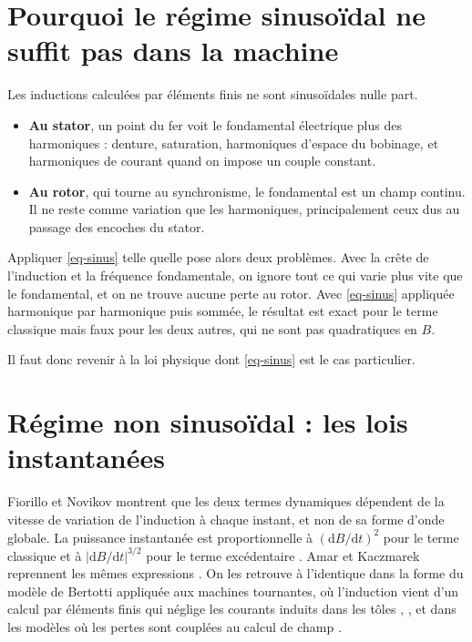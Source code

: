 \documentclass[11pt,a4paper]{article}
\newcommand{\dd}{\mathrm{d}}
\begin{document}
\section{Pourquoi le régime sinusoïdal ne suffit pas dans la machine}

Les inductions calculées par éléments finis ne sont sinusoïdales nulle part.
\begin{itemize}
    \item \textbf{Au stator}, un point du fer voit le fondamental électrique plus des harmoniques : denture, saturation, harmoniques d'espace du bobinage, et harmoniques de courant quand on impose un couple constant.
    \item \textbf{Au rotor}, qui tourne au synchronisme, le fondamental est un champ continu. Il ne reste comme variation que les harmoniques, principalement ceux dus au passage des encoches du stator.
\end{itemize}
Appliquer \eqref{eq-sinus} telle quelle pose alors deux problèmes. Avec la crête de l'induction et la fréquence fondamentale, on ignore tout ce qui varie plus vite que le fondamental, et on ne trouve aucune perte au rotor. Avec \eqref{eq-sinus} appliquée harmonique par harmonique puis sommée, le résultat est exact pour le terme classique mais faux pour les deux autres, qui ne sont pas quadratiques en $B$.

Il faut donc revenir à la loi physique dont \eqref{eq-sinus} est le cas particulier.

\section{Régime non sinusoïdal : les lois instantanées}

Fiorillo et Novikov \cite{Fio90} montrent que les deux termes dynamiques dépendent de la vitesse de variation de l'induction à chaque instant, et non de sa forme d'onde globale. La puissance instantanée est proportionnelle à $(\dd B/\dd t)^2$ pour le terme classique \cite[Eq.~4]{Fio90} et à $|\dd B/\dd t|^{3/2}$ pour le terme excédentaire \cite[Eq.~12]{Fio90}. Amar et Kaczmarek reprennent les mêmes expressions \cite[Eq.~2 et 3]{Ama95}. On les retrouve à l'identique dans la forme du modèle de Bertotti appliquée aux machines tournantes, où l'induction vient d'un calcul par éléments finis qui néglige les courants induits dans les tôles \cite[Eq.~1]{Yam10}, \cite[Eq.~I-23 et I-24]{Car21}, et dans les modèles où les pertes sont couplées au calcul de champ \cite[Eq.~2 et 5]{Ras12}.
\end{document}
